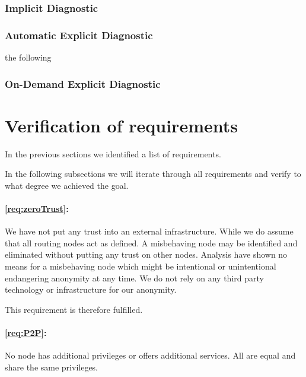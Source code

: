 

\subsubsection{Implicit Diagnostic}

\subsubsection{Automatic Explicit Diagnostic}
                                        the following
\subsubsection{On-Demand Explicit Diagnostic}




\section{Verification of requirements}
In the previous sections we identified a list of requirements.

In the following subsections we will iterate through all requirements and verify to what degree we achieved the goal.

\paragraph*{\ref{req:zeroTrust}:} 
We have not put any trust into an external infrastructure. While we do assume that all routing nodes act as defined. A misbehaving node may be identified and eliminated without putting any trust on other nodes. Analysis have shown no means for a misbehaving node which might be intentional or unintentional endangering anonymity at any time. We do not rely on any third party technology or infrastructure for our anonymity. 

This requirement is therefore fulfilled.

\paragraph*{\ref{req:P2P}:} 
No node has additional privileges or offers additional services. All are equal and share the same privileges.

